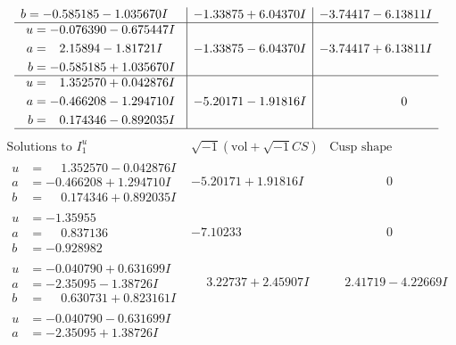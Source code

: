 \documentclass[1p]{elsarticle_modified}
\theoremstyle{definition}
\newcommand{\I}{\sqrt{-1}}
\begin{document}
$$\begin{array}{c|c|c}
\begin{aligned}
b &= -0.585185 - 1.035670 I\end{aligned}
 & -1.33875 + 6.04370 I & -3.74417 - 6.13811 I \\ \hline\begin{aligned}
u &= -0.076390 - 0.675447 I \\
a &= \phantom{-}2.15894 - 1.81721 I \\
b &= -0.585185 + 1.035670 I\end{aligned}
 & -1.33875 - 6.04370 I & -3.74417 + 6.13811 I \\ \hline\begin{aligned}
u &= \phantom{-}1.352570 + 0.042876 I \\
a &= -0.466208 - 1.294710 I \\
b &= \phantom{-}0.174346 - 0.892035 I\end{aligned}
 & -5.20171 - 1.91816 I & \phantom{-0.000000 } 0\\
 \hline 
 \end{array}$$\newpage$$\begin{array}{c|c|c}  
\text{Solutions to }I^u_{1}& \I (\text{vol} + \sqrt{-1}CS) & \text{Cusp shape}\\
 \hline 
\begin{aligned}
u &= \phantom{-}1.352570 - 0.042876 I \\
a &= -0.466208 + 1.294710 I \\
b &= \phantom{-}0.174346 + 0.892035 I\end{aligned}
 & -5.20171 + 1.91816 I & \phantom{-0.000000 } 0 \\ \hline\begin{aligned}
u &= -1.35955\phantom{ +0.000000I} \\
a &= \phantom{-}0.837136\phantom{ +0.000000I} \\
b &= -0.928982\phantom{ +0.000000I}\end{aligned}
 & -7.10233\phantom{ +0.000000I} & \phantom{-0.000000 } 0 \\ \hline\begin{aligned}
u &= -0.040790 + 0.631699 I \\
a &= -2.35095 - 1.38726 I \\
b &= \phantom{-}0.630731 + 0.823161 I\end{aligned}
 & \phantom{-}3.22737 + 2.45907 I & \phantom{-}2.41719 - 4.22669 I \\ \hline\begin{aligned}
u &= -0.040790 - 0.631699 I \\
a &= -2.35095 + 1.38726 I \\

\end{aligned}
\end{array}$$
\end{document}
